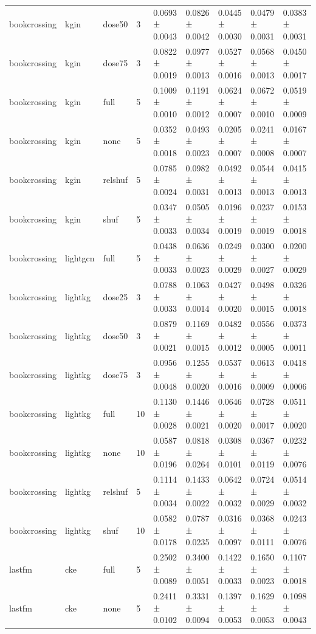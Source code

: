 \begin{table}[t]
\begin{tabular}{lllllllll}
bookcrossing & kgin & dose50 & 3 & 0.0693 ± 0.0043 & 0.0826 ± 0.0042 & 0.0445 ± 0.0030 & 0.0479 ± 0.0031 & 0.0383 ± 0.0031 \\
bookcrossing & kgin & dose75 & 3 & 0.0822 ± 0.0019 & 0.0977 ± 0.0013 & 0.0527 ± 0.0016 & 0.0568 ± 0.0013 & 0.0450 ± 0.0017 \\
bookcrossing & kgin & full & 5 & 0.1009 ± 0.0010 & 0.1191 ± 0.0012 & 0.0624 ± 0.0007 & 0.0672 ± 0.0010 & 0.0519 ± 0.0009 \\
bookcrossing & kgin & none & 5 & 0.0352 ± 0.0018 & 0.0493 ± 0.0023 & 0.0205 ± 0.0007 & 0.0241 ± 0.0008 & 0.0167 ± 0.0007 \\
bookcrossing & kgin & relshuf & 5 & 0.0785 ± 0.0024 & 0.0982 ± 0.0031 & 0.0492 ± 0.0013 & 0.0544 ± 0.0013 & 0.0415 ± 0.0013 \\
bookcrossing & kgin & shuf & 5 & 0.0347 ± 0.0033 & 0.0505 ± 0.0034 & 0.0196 ± 0.0019 & 0.0237 ± 0.0019 & 0.0153 ± 0.0018 \\
bookcrossing & lightgcn & full & 5 & 0.0438 ± 0.0033 & 0.0636 ± 0.0023 & 0.0249 ± 0.0029 & 0.0300 ± 0.0027 & 0.0200 ± 0.0029 \\
bookcrossing & lightkg & dose25 & 3 & 0.0788 ± 0.0033 & 0.1063 ± 0.0014 & 0.0427 ± 0.0020 & 0.0498 ± 0.0015 & 0.0326 ± 0.0018 \\
bookcrossing & lightkg & dose50 & 3 & 0.0879 ± 0.0021 & 0.1169 ± 0.0015 & 0.0482 ± 0.0012 & 0.0556 ± 0.0005 & 0.0373 ± 0.0011 \\
bookcrossing & lightkg & dose75 & 3 & 0.0956 ± 0.0048 & 0.1255 ± 0.0020 & 0.0537 ± 0.0016 & 0.0613 ± 0.0009 & 0.0418 ± 0.0006 \\
bookcrossing & lightkg & full & 10 & 0.1130 ± 0.0028 & 0.1446 ± 0.0021 & 0.0646 ± 0.0020 & 0.0728 ± 0.0017 & 0.0511 ± 0.0020 \\
bookcrossing & lightkg & none & 10 & 0.0587 ± 0.0196 & 0.0818 ± 0.0264 & 0.0308 ± 0.0101 & 0.0367 ± 0.0119 & 0.0232 ± 0.0076 \\
bookcrossing & lightkg & relshuf & 5 & 0.1114 ± 0.0034 & 0.1433 ± 0.0022 & 0.0642 ± 0.0032 & 0.0724 ± 0.0029 & 0.0514 ± 0.0032 \\
bookcrossing & lightkg & shuf & 10 & 0.0582 ± 0.0178 & 0.0787 ± 0.0235 & 0.0316 ± 0.0097 & 0.0368 ± 0.0111 & 0.0243 ± 0.0076 \\
lastfm & cke & full & 5 & 0.2502 ± 0.0089 & 0.3400 ± 0.0051 & 0.1422 ± 0.0033 & 0.1650 ± 0.0023 & 0.1107 ± 0.0018 \\
lastfm & cke & none & 5 & 0.2411 ± 0.0102 & 0.3331 ± 0.0094 & 0.1397 ± 0.0053 & 0.1629 ± 0.0053 & 0.1098 ± 0.0043 \\

\end{tabular}
\end{table}

